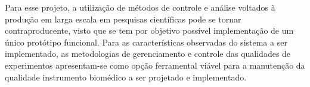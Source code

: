 \begin{anexosenv}
Para esse projeto, a utilização de métodos de controle e análise voltados à produção em larga escala em pesquisas científicas pode se tornar contraproducente, visto que se tem por objetivo possível implementação de um único protótipo funcional. Para as características observadas do sistema a ser implementado, as metodologias de gerenciamento e controle das qualidades de experimentos apresentam-se como opção ferramental viável para a manutenção da qualidade instrumento biomédico a ser projetado e implementado.

\end{anexosenv}

